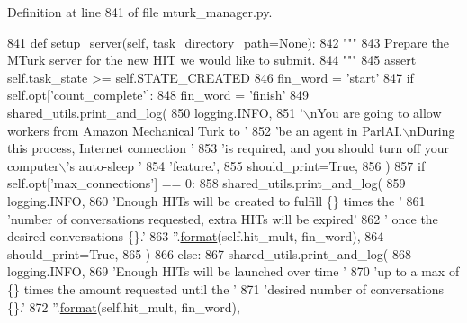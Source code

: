 Definition at line 841 of file mturk\+\_\+manager.\+py.


\begin{DoxyCode}
841     \textcolor{keyword}{def }\hyperlink{namespaceparlai_1_1chat__service_1_1services_1_1messenger_1_1server__utils_afb56b04206cd0f42384438f1ac6d9cda}{setup\_server}(self, task\_directory\_path=None):
842         \textcolor{stringliteral}{"""}
843 \textcolor{stringliteral}{        Prepare the MTurk server for the new HIT we would like to submit.}
844 \textcolor{stringliteral}{        """}
845         \textcolor{keyword}{assert} self.task\_state >= self.STATE\_CREATED
846         fin\_word = \textcolor{stringliteral}{'start'}
847         \textcolor{keywordflow}{if} self.opt[\textcolor{stringliteral}{'count\_complete'}]:
848             fin\_word = \textcolor{stringliteral}{'finish'}
849         shared\_utils.print\_and\_log(
850             logging.INFO,
851             \textcolor{stringliteral}{'\(\backslash\)nYou are going to allow workers from Amazon Mechanical Turk to '}
852             \textcolor{stringliteral}{'be an agent in ParlAI.\(\backslash\)nDuring this process, Internet connection '}
853             \textcolor{stringliteral}{'is required, and you should turn off your computer\(\backslash\)'s auto-sleep '}
854             \textcolor{stringliteral}{'feature.'},
855             should\_print=\textcolor{keyword}{True},
856         )
857         \textcolor{keywordflow}{if} self.opt[\textcolor{stringliteral}{'max\_connections'}] == 0:
858             shared\_utils.print\_and\_log(
859                 logging.INFO,
860                 \textcolor{stringliteral}{'Enough HITs will be created to fulfill \{\} times the '}
861                 \textcolor{stringliteral}{'number of conversations requested, extra HITs will be expired'}
862                 \textcolor{stringliteral}{' once the desired conversations \{\}.'}
863                 \textcolor{stringliteral}{''}.\hyperlink{namespaceparlai_1_1chat__service_1_1services_1_1messenger_1_1shared__utils_a32e2e2022b824fbaf80c747160b52a76}{format}(self.hit\_mult, fin\_word),
864                 should\_print=\textcolor{keyword}{True},
865             )
866         \textcolor{keywordflow}{else}:
867             shared\_utils.print\_and\_log(
868                 logging.INFO,
869                 \textcolor{stringliteral}{'Enough HITs will be launched over time '}
870                 \textcolor{stringliteral}{'up to a max of \{\} times the amount requested until the '}
871                 \textcolor{stringliteral}{'desired number of conversations \{\}.'}
872                 \textcolor{stringliteral}{''}.\hyperlink{namespaceparlai_1_1chat__service_1_1services_1_1messenger_1_1shared__utils_a32e2e2022b824fbaf80c747160b52a76}{format}(self.hit\_mult, fin\_word),

\end{DoxyCode}
